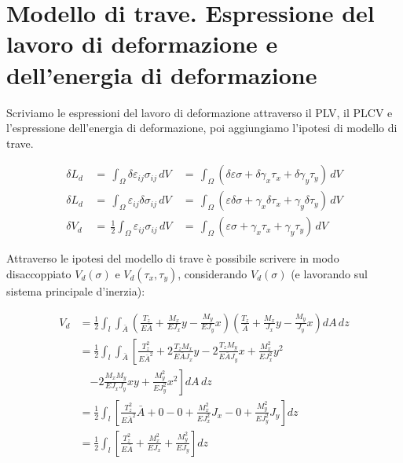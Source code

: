 \section{Modello di trave. Espressione del lavoro di deformazione e dell'energia di deformazione}

Scriviamo le espressioni del lavoro di deformazione attraverso il PLV, il PLCV e l'espressione dell'energia di deformazione, poi aggiungiamo l'ipotesi di modello di trave.

\begin{align*}
    \delta L_d \,&=\, \int_\Omega \delta\varepsilon_{ij}\sigma_{ij} \, dV \,&=\, \int_\Omega (\delta\varepsilon\sigma+ \delta\gamma_x\tau_x+ \delta\gamma_y\tau_y) \, dV\\
    \delta L_d \,&=\, \int_\Omega \varepsilon_{ij}\delta\sigma_{ij} \, dV \,&=\, \int_\Omega (\varepsilon\delta\sigma+ \gamma_x\delta\tau_x+ \gamma_y\delta\tau_y) \, dV\\
    \delta V_d \,&=\, \frac{1}{2}\int_\Omega \varepsilon_{ij}\sigma_{ij} \, dV \,&=\, \int_\Omega (\varepsilon\sigma+ \gamma_x\tau_x+ \gamma_y\tau_y) \, dV
\end{align*}

Attraverso le ipotesi del modello di trave è possibile scrivere in modo disaccoppiato $V_d(\sigma)$ e $V_d(\tau_x,\tau_y)$, considerando $V_d(\sigma)$ (e lavorando sul sistema principale d'inerzia):

\begin{align*}
    V_d 
    &= \frac{1}{2} \int_l \int_{\bar{A}} 
    \left(
        \frac{T_z}{E \bar{A}} 
        + \frac{M_x}{E J_x} y 
        - \frac{M_y}{E J_y} x
    \right)
    \left(
        \frac{T_z}{\bar{A}} 
        + \frac{M_x}{J_x} y 
        - \frac{M_y}{J_y} x
    \right)
    dA \, dz \\
    &= \frac{1}{2} \int_l \int_{\bar{A}} 
    \left[
        \frac{T_z^2}{E \bar{A}^2}
        + 2 \frac{T_z M_x}{E \bar{A} J_x} y
        - 2 \frac{T_z M_y}{E \bar{A} J_y} x
        + \frac{M_x^2}{E J_x^2} y^2
    \right. \\
    & \quad \left.
        - 2 \frac{M_x M_y}{E J_x J_y} x y
        + \frac{M_y^2}{E J_y^2} x^2
    \right]
    dA \, dz \\
    &= \frac{1}{2} \int_l 
    \left[
        \frac{T_z^2}{E \bar{A}^2} \bar{A}
        + 0
        - 0
        + \frac{M_x^2}{E J_x^2} J_x
        - 0
        + \frac{M_y^2}{E J_y^2} J_y
    \right]
    dz \\
    &= \frac{1}{2} \int_l 
    \left[
        \frac{T_z^2}{E \bar{A}} 
        + \frac{M_x^2}{E J_x} 
        + \frac{M_y^2}{E J_y}
    \right] dz
\end{align*}

